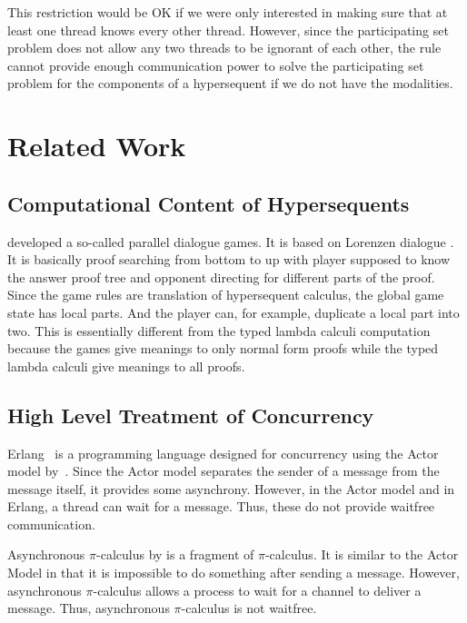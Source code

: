 This restriction would be OK if we were only interested in making sure that
at least one thread knows every other thread.  However, since the
participating set problem does not allow any two threads to be ignorant
of each other, the \verb@comm@ rule cannot provide enough communication power
to solve the participating set problem for the components of a
hypersequent if we do not have the modalities.

\section{Related Work}

\subsection{Computational Content of Hypersequents}


\citet{parallel} developed a so-called parallel dialogue games.  It is
based on Lorenzen dialogue .  It is basically proof searching from
bottom to up with player supposed
to know the answer proof tree and opponent directing for different parts
of the proof.  Since the game rules are translation of hypersequent
calculus, the global game state has local parts.  And the player can,
for example, duplicate a local part into two.  This is essentially
different from the typed lambda calculi computation because the games
give meanings to only normal form proofs while the typed lambda calculi
give meanings to all proofs.

\subsection{High Level Treatment of Concurrency}

Erlang~\citep{erlang} is a programming language designed for concurrency
using the Actor model by~\citet{actor}.
Since the Actor model separates the sender of a message from the message
itself, it provides some asynchrony.  However, in the Actor model and in
Erlang, a thread can wait for a message.  Thus, these do not provide
waitfree communication.


Asynchronous $\pi$-calculus by \citet{api} is a fragment of
$\pi$-calculus.  It is
similar to the Actor Model in that it is impossible to do something
after sending a message.  However, asynchronous $\pi$-calculus
allows a process to wait for a channel to deliver a message.  Thus,
asynchronous $\pi$-calculus is not waitfree.

